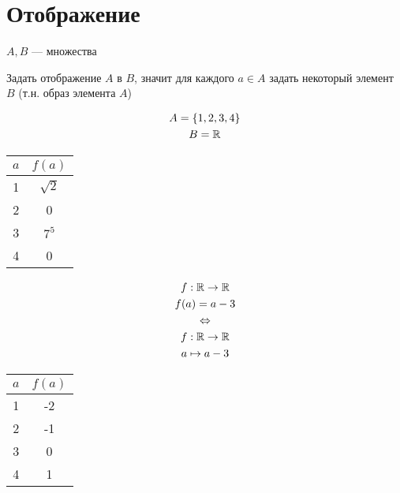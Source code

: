 \documentclass[main]{subfiles}
\begin{document}
\section{Отображение}
$A, B$ --- множества

\begin{definition}
    Задать отображение $A$ в $B$, значит для каждого $a \in A$ задать
    некоторый элемент $B$ (т.н. образ элемента $A$)
\end{definition}

\noindent\begin{minipage}{0.45\textwidth}
    \begin{gather*}
        A = \{1,2,3,4\}\\
        B = \mathbb{R}
    \end{gather*}
\end{minipage}
\begin{minipage}{0.45\textwidth}
    \begin{center}
        \begin{tabular}{c|c}
            $a$ & $f(a)$     \\
            \hline
            1   & $\sqrt{2}$ \\
            2   & 0          \\
            3   & $7^5$      \\
            4   & 0          \\
        \end{tabular}
    \end{center}
\end{minipage}

\noindent\begin{minipage}{0.45\textwidth}
    \begin{gather*}
        f: \mathbb{R} \to \mathbb{R}    \\
        f(a)=a-3        \\
        \Leftrightarrow \\
        f: \mathbb{R} \to \mathbb{R}    \\
        a \mapsto a-3
    \end{gather*}
\end{minipage}
\begin{minipage}{0.45\textwidth}
    \begin{center}
        \begin{tabular}{c|c}
            $a$ & $f(a)$ \\
            \hline
            1   & -2     \\
            2   & -1     \\
            3   & 0      \\
            4   & 1
        \end{tabular}
    \end{center}
\end{minipage}
\end{document}
